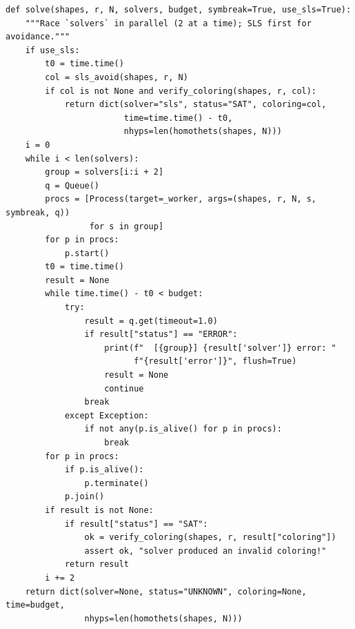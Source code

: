 \documentclass[12pt]{article}
\begin{document}
\begin{lstlisting}[style=plainstyle]
def solve(shapes, r, N, solvers, budget, symbreak=True, use_sls=True):
    """Race `solvers` in parallel (2 at a time); SLS first for avoidance."""
    if use_sls:
        t0 = time.time()
        col = sls_avoid(shapes, r, N)
        if col is not None and verify_coloring(shapes, r, col):
            return dict(solver="sls", status="SAT", coloring=col,
                        time=time.time() - t0,
                        nhyps=len(homothets(shapes, N)))
    i = 0
    while i < len(solvers):
        group = solvers[i:i + 2]
        q = Queue()
        procs = [Process(target=_worker, args=(shapes, r, N, s, symbreak, q))
                 for s in group]
        for p in procs:
            p.start()
        t0 = time.time()
        result = None
        while time.time() - t0 < budget:
            try:
                result = q.get(timeout=1.0)
                if result["status"] == "ERROR":
                    print(f"  [{group}] {result['solver']} error: "
                          f"{result['error']}", flush=True)
                    result = None
                    continue
                break
            except Exception:
                if not any(p.is_alive() for p in procs):
                    break
        for p in procs:
            if p.is_alive():
                p.terminate()
            p.join()
        if result is not None:
            if result["status"] == "SAT":
                ok = verify_coloring(shapes, r, result["coloring"])
                assert ok, "solver produced an invalid coloring!"
            return result
        i += 2
    return dict(solver=None, status="UNKNOWN", coloring=None, time=budget,
                nhyps=len(homothets(shapes, N)))


\end{lstlisting}
\end{document}

